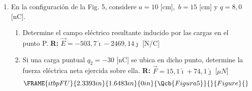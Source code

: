 \documentclass[12pt]{article}
\begin{document}
\begin{enumerate}
\item En la configuraci\'{o}n de la Fig. 5, considere $a=10$
[cm],\thinspace\ $b=15$ [cm] y $q=8,0$ [nC]$.$

\begin{enumerate}
\item Determine el campo el\'{e}ctrico resultante inducido por las cargas en
el punto P. \textbf{R: }$\vec{E}=-503,7\hat{\imath}-2469,14\hat{\jmath}$
[N/C]

\item Si una carga puntual $q_{2}=-30$ [nC] se ubica en dicho punto,
determine la fuerza el\'{e}ctrica neta ejercida sobre ella. \textbf{R: }$%
\vec{F}=15,1\hat{\imath}+74,1\hat{\jmath}$ [$\mu N$]%
\begin{equation*}
\FRAME{itbpFU}{2.3393in}{1.6483in}{0in}{\Qcb{Figura 5}}{}{Figure}{\special%
{language "Scientific Word";type "GRAPHIC";maintain-aspect-ratio
TRUE;display "USEDEF";valid_file "T";width 2.3393in;height 1.6483in;depth
0in;original-width 4.0811in;original-height 2.8669in;cropleft "0";croptop
"1";cropright "1";cropbottom "0";tempfilename '../../clases II-2020/230045
Electromagnetismo/QYQC4Q0G.wmf';tempfile-properties "XPR";}}
\end{equation*}
\end{enumerate}
\end{enumerate}
\end{document}
